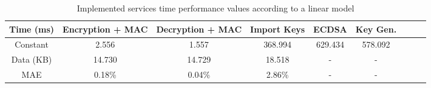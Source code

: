\begin{table}[h!]
\centering
\def\arraystretch{1.5}
\begin{tabular}{|c|c|c|c|c|c|c|c|c|}
\hline
	Time (ms) & Encryption + MAC & Decryption + MAC & Import Keys & ECDSA & Key Gen. \\ \hline
	Constant  & 2.556  & 1.557   & 368.994 & 629.434 & 578.092 \\ \hline
	Data (KB) & 14.730  & 14.729  & 18.518  & - & - \\ \hline
	MAE	  & 0.18\% & 0.04\%  & 2.86\%  & - & - \\ \hline
\end{tabular}
\caption{Implemented services time performance values according to a linear model}
\label{tab:services-model}
\end{table}
